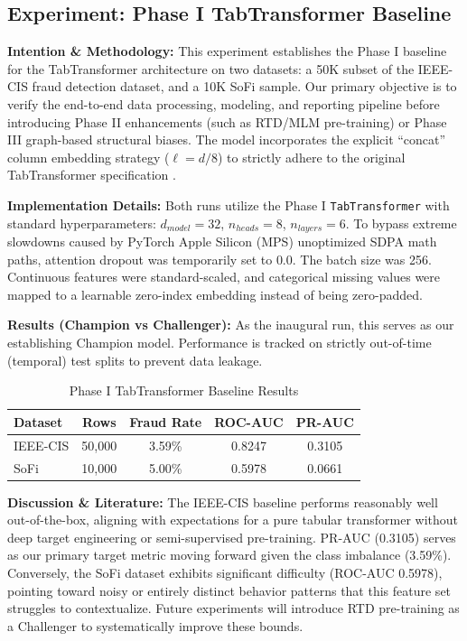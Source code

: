 \subsection{Experiment: Phase I TabTransformer Baseline}
\label{sec:exp_phase1_baseline}

\textbf{Intention \& Methodology:} 
This experiment establishes the Phase I baseline for the TabTransformer architecture on two datasets: a 50K subset of the IEEE-CIS fraud detection dataset, and a 10K SoFi sample. Our primary objective is to verify the end-to-end data processing, modeling, and reporting pipeline before introducing Phase II enhancements (such as RTD/MLM pre-training) or Phase III graph-based structural biases. The model incorporates the explicit ``concat'' column embedding strategy ($\ell=d/8$) to strictly adhere to the original TabTransformer specification \cite{huang_tabtransformer_2020}.

\textbf{Implementation Details:}
Both runs utilize the Phase I \texttt{TabTransformer} with standard hyperparameters: $d_{model}=32$, $n_{heads}=8$, $n_{layers}=6$. To bypass extreme slowdowns caused by PyTorch Apple Silicon (MPS) unoptimized SDPA math paths, attention dropout was temporarily set to $0.0$. The batch size was 256. Continuous features were standard-scaled, and categorical missing values were mapped to a learnable zero-index embedding instead of being zero-padded. 

\textbf{Results (Champion vs Challenger):}
As the inaugural run, this serves as our establishing Champion model. Performance is tracked on strictly out-of-time (temporal) test splits to prevent data leakage.

\begin{table}[h]
\centering
\begin{tabular}{|l|c|c|c|c|}
\hline
\textbf{Dataset} & \textbf{Rows} & \textbf{Fraud Rate} & \textbf{ROC-AUC} & \textbf{PR-AUC} \\ \hline
IEEE-CIS & 50,000 & 3.59\% & 0.8247 & 0.3105 \\ \hline
SoFi & 10,000 & 5.00\% & 0.5978 & 0.0661 \\ \hline
\end{tabular}
\caption{Phase I TabTransformer Baseline Results}
\label{tab:phase1_baseline}
\end{table}

\textbf{Discussion \& Literature:}
The IEEE-CIS baseline performs reasonably well out-of-the-box, aligning with expectations for a pure tabular transformer without deep target engineering or semi-supervised pre-training. PR-AUC (0.3105) serves as our primary target metric moving forward given the class imbalance (3.59\%).
Conversely, the SoFi dataset exhibits significant difficulty (ROC-AUC 0.5978), pointing toward noisy or entirely distinct behavior patterns that this feature set struggles to contextualize. Future experiments will introduce RTD pre-training \cite{huang_tabtransformer_2020} as a Challenger to systematically improve these bounds.
